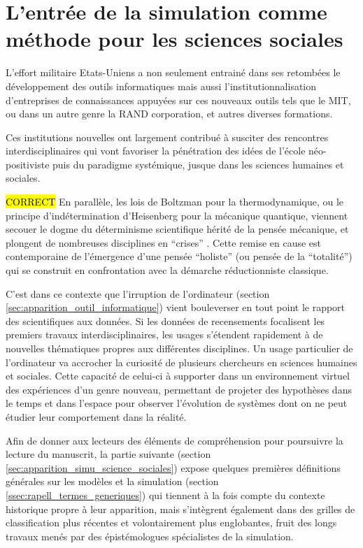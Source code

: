 
\section{L'entrée de la simulation comme méthode pour les sciences sociales}

L'effort militaire Etats-Uniens a non seulement entrainé dans ses retombées le développement des outils informatiques mais aussi l'institutionnalisation d'entreprises de connaissances appuyées sur ces nouveaux outils tels que le MIT, ou dans un autre genre la RAND corporation, et autres diverses formations.

Ces institutions nouvelles ont largement contribué à susciter des rencontres interdisciplinaires qui vont favoriser la pénétration des idées de l'école néo-positiviste puis du paradigme systémique, jusque dans les sciences humaines et sociales.

\hl{CORRECT}
En parallèle, les lois de Boltzman pour la thermodynamique, ou le principe d’indétermination d'Heisenberg pour la mécanique quantique, viennent secouer le dogme du déterminisme scientifique hérité de la pensée mécanique, et plongent de nombreuses disciplines en \enquote{crises} \autocite[20-23]{Pouvreau2013}. Cette remise en cause est contemporaine de l'émergence d'une pensée \enquote{holiste} (ou pensée de la \enquote{totalité}) qui se construit en confrontation avec la démarche réductionniste classique.

C'est dans ce contexte que l'irruption de l'ordinateur (section \ref{sec:apparition_outil_informatique}) vient bouleverser en tout point le rapport des scientifiques aux données. Si les données de recensements focalisent les premiers travaux interdisciplinaires, les usages s'étendent rapidement à de nouvelles thématiques propres aux différentes disciplines. Un usage particulier de l'ordinateur va accrocher la curiosité de plusieurs chercheurs en sciences humaines et sociales. Cette capacité de celui-ci à supporter dans un environnement virtuel des expériences d'un genre nouveau, permettant de projeter des hypothèses dans le temps et dans l'espace pour observer l'évolution de systèmes dont on ne peut étudier leur comportement dans la réalité.

Afin de donner aux lecteurs des éléments de compréhension pour poursuivre la lecture du manuscrit, la partie suivante (section \ref{sec:apparition_simu_science_sociales}) expose quelques premières définitions générales sur les modèles et la simulation (section \ref{ssec:rapell_termes_generiques}) qui tiennent à la fois compte du contexte historique propre à leur apparition, mais s'intègrent également dans des grilles de classification plus récentes et volontairement plus englobantes, fruit des longs travaux menés par des épistémologues spécialistes de la simulation.

